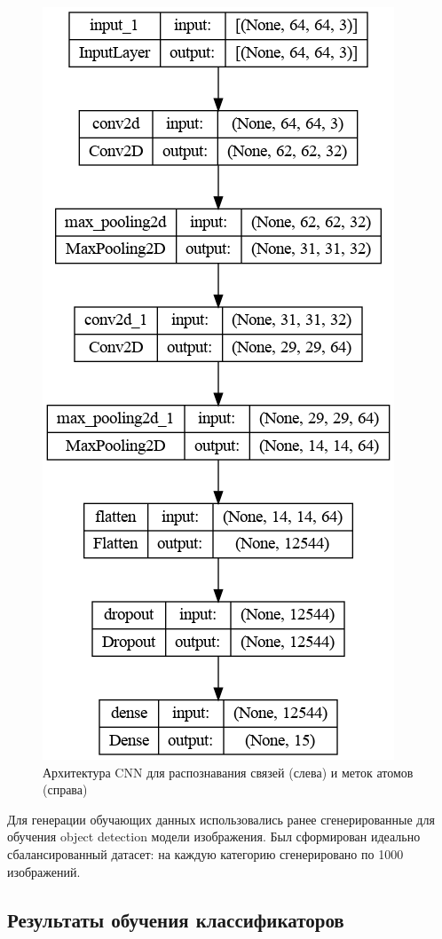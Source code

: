 \begin{figure}[ht!]
	\includegraphics [scale=0.3] {my_folder/images/model_atom}
	\caption{Архитектура CNN для распознавания связей (слева) и меток атомов (справа)}
	\label{fig:AP50_modelbondatom}
\end{figure}

Для генерации обучающих данных использовались ранее сгенерированные для обучения object detection модели изображения. Был сформирован идеально сбалансированный датасет: на каждую категорию сгенерировано по 1000 изображений.

\subsection{Результаты обучения классификаторов}

